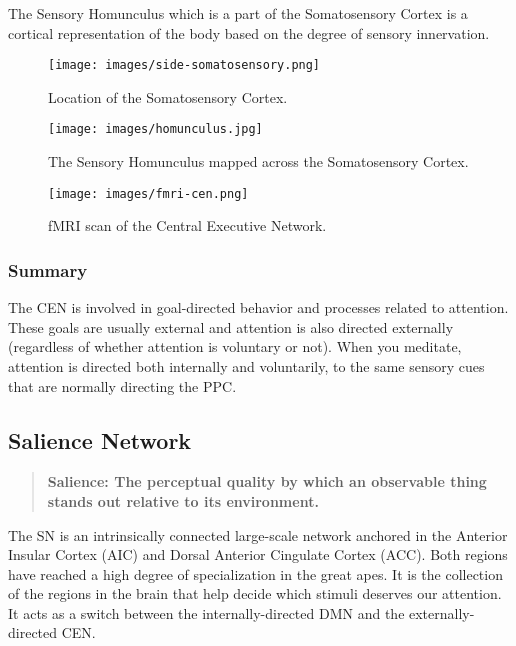 \documentclass[a4paper, amsfonts, amssymb, amsmath, reprint, showkeys, nofootinbib, twoside]{revtex4-1}
\begin{document}
The Sensory Homunculus which is a part of the Somatosensory Cortex is a cortical representation
of the body based on the degree of sensory innervation. \cite{sensoryhom}

\begin{figure}[H]
  \centering
  \texttt{[image: images/side-somatosensory.png]}
  \caption{Location of the Somatosensory Cortex.}
  \label{fig:side-somatosensory}
\end{figure}

\begin{figure}[H]
  \centering
  \texttt{[image: images/homunculus.jpg]}
  \caption{The Sensory Homunculus mapped across the Somatosensory Cortex.}
  \label{fig:homunculus}
\end{figure}

\begin{figure}[H]
  \centering
  \texttt{[image: images/fmri-cen.png]}
  \caption{fMRI scan of the Central Executive Network.}
  \label{fig:fmri-cen}
\end{figure}

\subsubsection{Summary}

The CEN is involved in goal-directed behavior and processes
related to attention. These goals are usually external and attention is also directed
externally (regardless of whether attention is voluntary or not). When you meditate,
attention is directed both internally and voluntarily, to the same sensory cues that
are normally directing the PPC.

\subsection{Salience Network}

\begin{quote}
  \textbf{Salience: The perceptual quality by which an observable thing stands out
    relative to its environment.}
\end{quote}

The SN is an intrinsically connected large-scale network anchored in the Anterior
Insular Cortex (AIC) and Dorsal Anterior Cingulate Cortex (ACC). Both regions have reached a
high degree of specialization in the great apes. It is the collection of the regions
in the brain that help decide which stimuli deserves our attention. It acts as a
switch between the internally-directed DMN and the externally-directed CEN. \cite{saliencenetwork}
\end{document}
